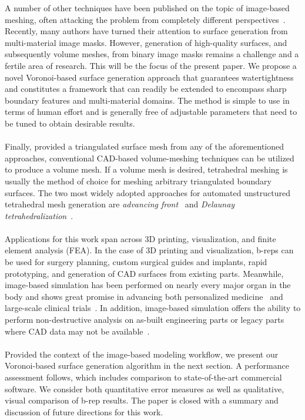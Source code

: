 %
A number of other techniques have been published on the topic of image-based meshing, often attacking the problem from completely different perspectives~\cite{fang_2009, mohamed_2004, jermyn_2013, boissonnat_2009}. Recently, many authors have turned their attention to surface generation from multi-material image masks. However, generation of high-quality surfaces, and subsequently volume meshes, from binary image masks remains a challenge and a fertile area of research. This will be the focus of the present paper.  We propose a novel Voronoi-based surface generation approach that guarantees watertightness and constitutes a framework that can readily be extended to encompass sharp boundary features and multi-material domains. The method is simple to use in terms of human effort and is generally free of adjustable parameters that need to be tuned to obtain desirable results. \\ \\
%
Finally, provided a triangulated surface mesh from any of the aforementioned approaches, conventional CAD-based volume-meshing techniques can be utilized to produce a volume mesh. If a volume mesh is desired, tetrahedral meshing is usually the method of choice for meshing arbitrary triangulated boundary surfaces. The two most widely adopted approaches for automated unstructured tetrahedral mesh generation are \textit{advancing front}~\cite{jin_1993, lohner_1988} and \textit{Delaunay tetrahedralization}~\cite{lohner_1997}. \\ \\
%
Applications for this work span across 3D printing, visualization, and finite element analysis (FEA). In the case of 3D printing and visualization, b-reps can be used for surgery planning, custom surgical guides and implants, rapid prototyping, and generation of CAD surfaces from existing parts. Meanwhile, image-based simulation has been performed on nearly every major organ in the body and shows great promise in advancing both personalized medicine~\cite{neal2010current} and large-scale clinical trials~\cite{viceconti2016silico}. In addition, image-based simulation offers the ability to perform non-destructive analysis on as-built engineering parts or legacy parts where CAD data may not be available~\cite{bradley2005advances}.\\ \\
%
Provided the context of the image-based modeling workflow, we present our Voronoi-based surface generation algorithm in the next section. A performance assessment follows, which includes comparison to state-of-the-art commercial software.  We consider both quantitative error measures as well as qualitative, visual comparison of b-rep results.  The paper is closed with a summary and discussion of future directions for this work.